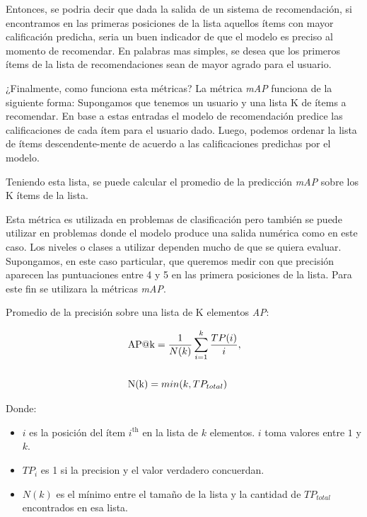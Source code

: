 \documentclass[11pt,a4paper,twoside]{thesis}
\begin{document}
Entonces, se podria decir que dada la salida de un sistema de recomendación, si
encontramos en las primeras posiciones de la lista aquellos ítems con mayor
calificación predicha, seria un buen indicador de que el modelo es preciso al
momento de recomendar. En palabras mas simples, se desea que los primeros ítems
de la lista de recomendaciones sean de mayor agrado para el usuario.

¿Finalmente, como funciona esta métricas? La métrica
\textit{mAP\makeatletter@k} funciona de la siguiente forma: Supongamos que tenemos
un usuario y una lista K de ítems a recomendar. En base
a estas entradas el modelo de recomendación predice las calificaciones de cada
ítem para el usuario dado. Luego, podemos ordenar la lista de ítems
descendente-mente de acuerdo a las calificaciones predichas por el modelo.

Teniendo esta lista, se puede calcular el promedio de la predicción
\textit{mAP\makeatletter@k} sobre los K ítems de la lista.

Esta métrica es utilizada en problemas de clasificación pero también se puede
utilizar en problemas donde el modelo produce una salida numérica como en este
caso. Los niveles o clases a utilizar dependen mucho de que se quiera evaluar.
Supongamos, en este caso particular, que queremos medir con que precisión
aparecen las puntuaciones entre 4 y 5 en las primera posiciones de la lista.
Para este fin se utilizara la métricas \textit{mAP\makeatletter@k}.

\begin{description}
	\item[Promedio de la precisión sobre una lista de K elementos
	\textit{AP\makeatletter@k}:]
\end{description}
\begin{equation}
	\begin{split}
		& \operatorname{AP\makeatletter@k}=\frac{1}{N(k)} \sum_{i=1}^k \frac{ TP(i)}{i}, \\
		& \\
		& \operatorname{N(k)} = min(k, TP_{total}) \\
	\end{split}
\end{equation}
\begin{description}
	\item[Donde:]
\end{description}
\begin{itemize}
	\item $i$ es la posición del ítem $i^\mathrm{th}$ en la lista de $k$ elementos. $i$  toma valores entre $1$ y $k$.
	\item $TP_i$ es 1 si la precision y el valor verdadero concuerdan.
	\item $N(k)$ es el mínimo entre el tamaño de la lista y la cantidad de $TP_{total}$ encontrados en esa lista.
\end{itemize}
\end{document}
